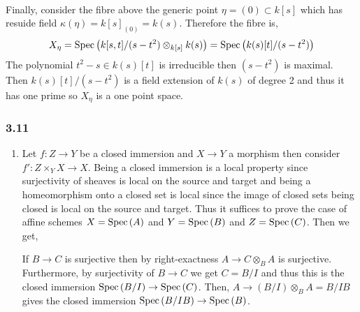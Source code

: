 \documentclass[12pt]{article}
\begin{document}
\begin{enumerate}
\bigskip\\
Finally, consider the fibre above the generic point $\eta = (0) \subset k[s]$ which has resuide field $\kappa(\eta) = k[s]_{(0)} = k(s)$. Therefore the fibre is,
\[ X_\eta = \mathrm{Spec}\left( k[s, t]/(s - t^2) \otimes_{k[s]} k(s) \right) = \mathrm{Spec}\left( k(s)[t]/(s - t^2) \right) \] 
The polynomial $t^2 - s \in k(s)[t]$ is irreducible then $(s - t^2)$ is maximal. Then $k(s)[t]/(s - t^2)$ is a field extension of $k(s)$ of degree 2 and thus it has one prime so $X_\eta$ is a one point space.
\end{enumerate}

\subsubsection{3.11}

\begin{enumerate}
\item Let $f : Z \to Y$ be a closed immersion and $X \to Y$ a morphism then consider $f' : Z \times_Y X \to X$. Being a closed immersion is a local property since surjectivity of sheaves is local on the source and target and being a homeomorphism onto a closed set is local since the image of closed sets being closed is local on the source and target. Thus it suffices to prove the case of affine schemes $X = \mathrm{Spec}\left( A \right)$ and $Y = \mathrm{Spec}\left( B \right)$ and $Z = \mathrm{Spec}\left( C \right)$. Then we get,
\begin{center}
\end{center}
If $B \to C$ is surjective then by right-exactness $A \to C \otimes_B A$ is surjective. Furthermore, by surjectivity of $B \to C$ we get $C = B / I$ and thus this is the closed immersion 
$\mathrm{Spec}\left( B/I \right) \to \mathrm{Spec}\left( C \right)$. Then, $A \to (B / I) \otimes_B A = B / I B$ gives the closed immersion $\mathrm{Spec}\left( B / I B \right) \to \mathrm{Spec}\left( B \right)$.


\end{enumerate}
\end{document}
